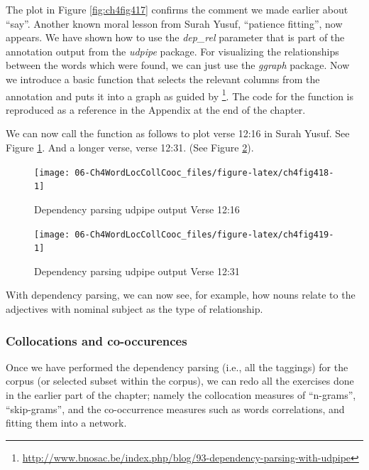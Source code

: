 \documentclass[
]{article}
\begin{document}
The plot in Figure \ref{fig:ch4fig417} confirms the comment we made earlier about ``say''. Another known moral lesson from Surah Yusuf, ``patience fitting'', now appears.
We have shown how to use the \emph{dep\_rel} parameter that is part of the annotation output from the \emph{udpipe} package. For visualizing the relationships between the words which were found, we can just use the \emph{ggraph} package. Now we introduce a basic function that selects the relevant columns from the annotation and puts it into a graph as guided by \citet{udpipe} \footnote{\url{http://www.bnosac.be/index.php/blog/93-dependency-parsing-with-udpipe}}. The code for the function is reproduced as a reference in the Appendix at the end of the chapter.

We can now call the function as follows to plot verse 12:16 in Surah Yusuf. See Figure \ref{fig:ch4fig418}. And a longer verse, verse 12:31. (See Figure \ref{fig:ch4fig419}).

\begin{figure}

{\centering \texttt{[image: 06-Ch4WordLocCollCooc\_files/figure-latex/ch4fig418-1]} 

}

\caption{Dependency parsing udpipe output Verse 12:16}\label{fig:ch4fig418}
\end{figure}

\begin{figure}

{\centering \texttt{[image: 06-Ch4WordLocCollCooc\_files/figure-latex/ch4fig419-1]} 

}

\caption{Dependency parsing udpipe output Verse 12:31}\label{fig:ch4fig419}
\end{figure}

With dependency parsing, we can now see, for example, how nouns relate to the adjectives with nominal subject as the type of relationship.

\hypertarget{collocations-and-co-occurences}{%
\subsubsection{Collocations and co-occurences}\label{collocations-and-co-occurences}}

Once we have performed the dependency parsing (i.e., all the taggings) for the corpus (or selected subset within the corpus), we can redo all the exercises done in the earlier part of the chapter; namely the collocation measures of ``n-grams'', ``skip-grams'', and the co-occurrence measures such as words correlations, and fitting them into a network.
\end{document}
